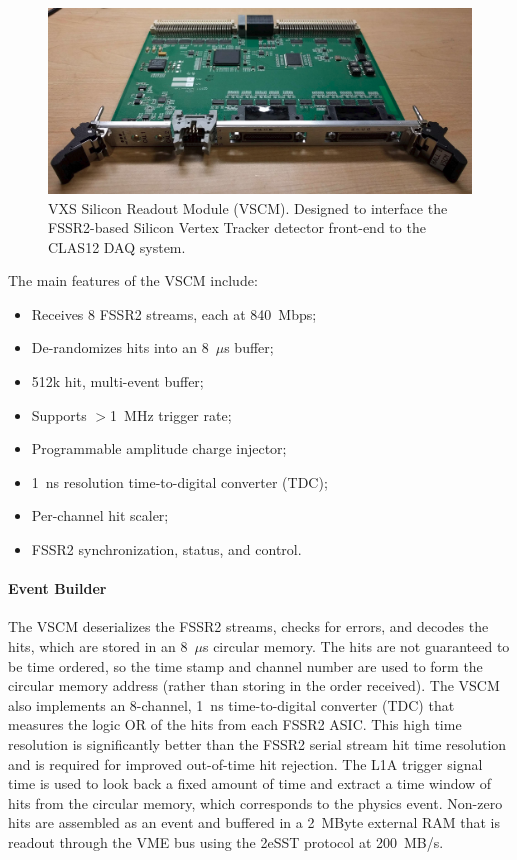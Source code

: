 \begin{figure}[hbt]
	\centering
	\includegraphics[width=1.0\columnwidth,keepaspectratio]{img/vscm_board.png}
	\caption{VXS Silicon Readout Module (VSCM). Designed to interface the FSSR2-based Silicon Vertex Tracker
          detector front-end to the CLAS12 DAQ system.}
	\label{fig:vscm_board}
\end{figure}

The main features of the VSCM include:

\begin{itemize}
	\item Receives 8 FSSR2 streams, each at 840~Mbps;
	\item De-randomizes hits into an 8~$\mu$s buffer;
	\item 512k hit, multi-event buffer;
	\item Supports $>$1~MHz trigger rate;
	\item Programmable amplitude charge injector;
	\item 1~ns resolution time-to-digital converter (TDC);
	\item Per-channel hit scaler;
	\item FSSR2 synchronization, status, and control.
\end{itemize}

\paragraph{Event Builder}
The VSCM deserializes the FSSR2 streams, checks for errors, and decodes the hits, which are stored in an 8~$\mu$s
circular memory. The hits are not guaranteed to be time ordered, so the time stamp and channel number are used to form
the circular memory address (rather than storing in the order received). The VSCM also implements an 8-channel, 1~ns
time-to-digital converter (TDC) that measures the logic OR of the hits from each FSSR2 ASIC. This high time resolution
is significantly better than the FSSR2 serial stream hit time resolution and is required for improved out-of-time hit
rejection. The L1A trigger signal time is used to look back a fixed amount of time and extract a time window of hits from
the circular memory, which corresponds to the physics event. Non-zero hits are assembled as an event and buffered in a
2~MByte external RAM that is readout through the VME bus using the 2eSST protocol at 200~MB/s.

